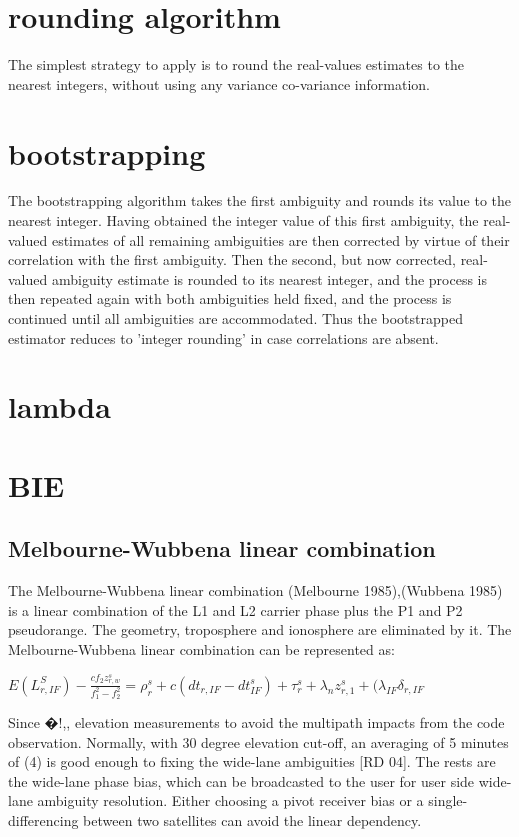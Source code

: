 \section{rounding algorithm}
The simplest strategy to apply is to round the real-values estimates to the nearest integers, without using any variance co-variance information.

\section{bootstrapping}

The bootstrapping algorithm takes the first ambiguity and rounds its value to the nearest integer. Having obtained the integer value of this first ambiguity, the real-valued estimates of all remaining ambiguities are then corrected by virtue of their correlation with the first ambiguity. Then the second, but now corrected, real-valued ambiguity estimate is rounded to its nearest integer, and the process is then repeated again with both ambiguities held fixed, and the process is continued until all ambiguities are accommodated. Thus the bootstrapped estimator reduces to ’integer rounding’ in case correlations are absent.

\section{lambda}

\section{BIE}


\subsection{Melbourne-Wubbena linear combination}
The Melbourne-Wubbena linear combination (Melbourne 1985),(Wubbena 1985) is a linear combination of the L1 and L2 carrier phase plus the P1 and P2 pseudorange. The geometry, troposphere and ionosphere are eliminated by it. The Melbourne-Wubbena linear combination can be represented as:

$
E(L_{r,IF}^S) - \frac{cf_2z_{r,w}^s}{f_1^2 - f_2^2} = \rho_r^s + c(dt_{r,IF} - dt_{IF}^s) + \tau_r^s + \lambda_n z_{r,1}^s + (\lambda_{IF}\delta_{r,IF}$

Since �!,,%
elevation measurements to avoid the multipath impacts from the code observation. Normally, with
30 degree elevation cut-off, an averaging of 5 minutes of (4) is good enough to fixing the wide-lane
ambiguities [RD 04]. The rests are the wide-lane phase bias, which can be broadcasted to the user for
user side wide-lane ambiguity resolution. Either choosing a pivot receiver bias or a single-differencing
between two satellites can avoid the linear dependency. 


